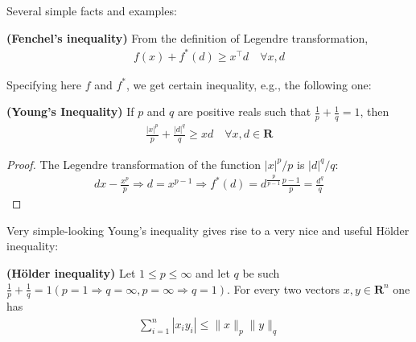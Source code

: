 \documentclass{article}
\newcommand{\bfs}[1]{\textbf{({#1}) }}
\begin{document}
Several simple facts and examples:
\begin{cora}\bfs{Fenchel’s inequality}
  From the definition of Legendre transformation,
\begin{align*}
f(x)+f^{*}(d) \geq x^{\top} d \quad \forall x, d
\end{align*}
\end{cora}
Specifying here $f$ and $f^{*}$, we get certain inequality, e.g., the following one: 
\begin{cora}\bfs{Young's Inequality}
  If $p$ and $q$ are positive reals such that $\frac{1}{p}+\frac{1}{q}=1$, then
\begin{align*}
\frac{|x|^{p}}{p}+\frac{|d|^{q}}{q} \geq x d \quad \forall x, d \in \mathbf{R}
\end{align*}
\end{cora}
\begin{proof}\color{ForestGreen}
The Legendre transformation of the function $|x|^{p} / p$ is $|d|^{q} / q$:
\begin{align}
    dx-\frac{x^p}{p}\Longrightarrow d=x^{p-1}\Longrightarrow f^*(d)=d^{\frac{p}{p-1}}\frac{p-1}{p}=\frac{d^q}{q}\label{eq:fbtr}
\end{align}
\end{proof}
Very simple-looking Young's inequality gives rise to a very nice and useful H\"{o}lder inequality:
\begin{cora}\bfs{H\"{o}lder inequality}
  Let $1 \leq p \leq \infty$ and let $q$ be such $\frac{1}{p}+\frac{1}{q}=1(p=1 \Rightarrow q=\infty, p=\infty \Rightarrow q=1)$. For every two vectors $x, y \in \mathbf{R}^{n}$ one has
\begin{align}
\sum_{i=1}^{n}\left|x_{i} y_{i}\right| \leq\|x\|_{p}\|y\|_{q}\label{eq:bjaiw}
\end{align}
\end{cora}
\end{document}
